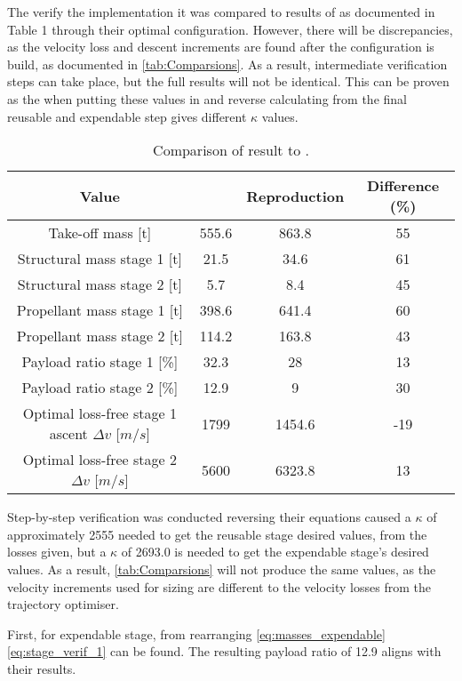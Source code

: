 
The verify the implementation it was compared to results of \cite{ReusbaleStaging} as documented in Table 1 through their optimal configuration. However, there will be discrepancies, as the velocity loss and descent increments are found after the configuration is build, as documented in \autoref{tab:Comparsions}. As a result, intermediate verification steps can take place, but the full results will not be identical. This can be proven as the when putting these values in and reverse calculating from the final reusable and expendable step gives different $\kappa$ values.

\begin{table}[H]
    \centering
    \caption{Comparison of result to \cite{ReusbaleStaging}.}
    \begin{tabular}{|c|c|c|c|}
    \hline
        Value & \cite{ReusbaleStaging} & Reproduction & Difference (\%) \\ \hline
        Take-off mass [t] & 555.6 & 863.8 & 55 \\
        Structural mass stage 1 [t] & 21.5 & 34.6 & 61 \\
        Structural mass stage 2 [t] & 5.7 & 8.4 & 45 \\
        Propellant mass stage 1 [t] & 398.6 & 641.4 & 60 \\
        Propellant mass stage 2 [t] & 114.2 & 163.8 & 43 \\
        Payload ratio stage 1 [\%] & 32.3 & 28 & 13 \\
        Payload ratio stage 2 [\%] & 12.9 & 9 & 30 \\
        Optimal loss-free stage 1 ascent $\Delta v$ [$m/s$] & 1799 & 1454.6 & -19 \\
        Optimal loss-free stage 2 $\Delta v$ [$m/s$] & 5600 & 6323.8 & 13 \\ \hline
    \end{tabular}
    \label{tab:Comparsions}
\end{table}

Step-by-step verification was conducted reversing their equations caused a $\kappa$ of approximately 2555 needed to get the reusable stage desired values, from the losses given, but a $\kappa$ of 2693.0 is needed to get the expendable stage's desired values. As a result, \autoref{tab:Comparsions} will not produce the same values, as the velocity increments used for sizing are different to the velocity losses from the trajectory optimiser.

First, for expendable stage, from rearranging \autoref{eq:masses_expendable} \autoref{eq:stage_verif_1} can be found. The resulting payload ratio of 12.9 aligns with their results.

